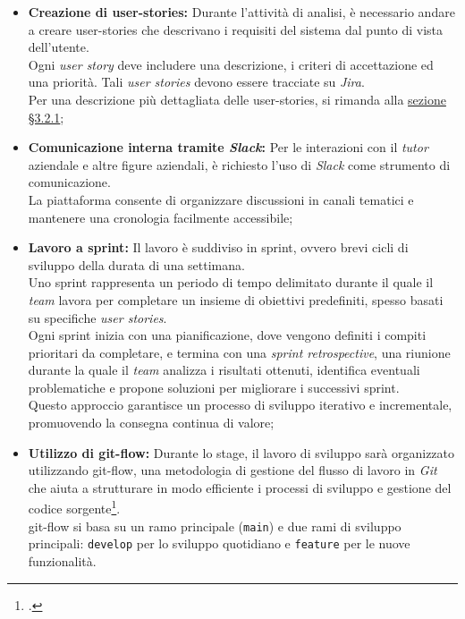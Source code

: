 \begin{itemize}
    \item \textbf{Creazione di \gls{user-stories}:} Durante l'attività di analisi, è necessario andare a creare \gls{user-stories} che descrivano i requisiti del sistema dal punto di vista dell’utente.\\
    Ogni \textit{user story} deve includere una descrizione, i criteri di accettazione ed una priorità.
    Tali \textit{user stories} devono essere tracciate su \textit{Jira}.\\
    Per una descrizione più dettagliata delle \gls{user-stories}, si rimanda alla \hyperref[subsec:user-story-mapping]{sezione §3.2.1};
    \item \textbf{Comunicazione interna tramite \textit{Slack}:} Per le interazioni con il \textit{tutor} aziendale e altre figure aziendali, è richiesto l’uso di \textit{Slack} come strumento di comunicazione.\\
    La piattaforma consente di organizzare discussioni in canali tematici e mantenere una cronologia facilmente accessibile;
    \item \textbf{Lavoro a \gls{sprint}:} Il lavoro è suddiviso in \gls{sprint}, ovvero brevi cicli di sviluppo della durata di una settimana.\\
    Uno \gls{sprint} rappresenta un periodo di tempo delimitato durante il quale il \textit{team} lavora per completare un insieme di obiettivi predefiniti, spesso basati su specifiche \textit{user stories}. \\
    Ogni \gls{sprint} inizia con una pianificazione, dove vengono definiti i compiti prioritari da completare, e termina con una \textit{sprint retrospective}, 
    una riunione durante la quale il \textit{team} analizza i risultati ottenuti, identifica eventuali problematiche e propone soluzioni per migliorare i successivi \gls{sprint}. \\
    Questo approccio garantisce un processo di sviluppo iterativo e incrementale, promuovendo la consegna continua di valore;
    \item \textbf{Utilizzo di \gls{git-flow}:} Durante lo stage, il lavoro di sviluppo sarà organizzato utilizzando \gls{git-flow}, una metodologia di gestione del flusso di lavoro in \textit{Git} che aiuta a strutturare in modo efficiente i processi di sviluppo e gestione del codice sorgente\footcite{site:git-flow}.\\
    \gls{git-flow} si basa su un ramo principale (\texttt{main}) e due rami di sviluppo principali: \texttt{develop} per lo sviluppo quotidiano e \texttt{feature} per le nuove funzionalità.\\

\end{itemize}
